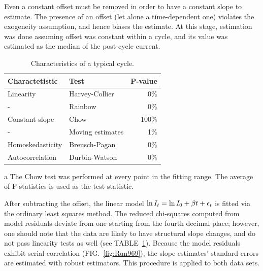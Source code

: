 \documentclass[reprint, superscriptaddress]{revtex4-1}
\begin{document}
Even a constant offset must be removed in order to have a constant slope to estimate. The presence of an offset (let alone a time-dependent one) violates the exogeneity assumption, and hence biases the estimate. At this stage, estimation was done assuming offset was constant within a cycle, and its value was estimated as the median of the post-cycle current.

\begin{table}
\centering
\begin{threeparttable}
	\caption{Characteristics of a typical cycle.\label{tbl:CycleChars}}
	\begin{tabular}{llr}
	\hline\hline
	Charactetistic	& Test 					& P-value\\
	\hline
	Linearity 		& Harvey-Collier		& 0\% \\
	-				& Rainbow				& 0\% \\
	Constant slope	& Chow\tnote{a}		 	& 100\% \\
	-				& Moving estimates		& 1\% \\
	Homoskedasticity& Breusch-Pagan 		& 0\% \\
	Autocorrelation & Durbin-Watson			& 0\% \\
	\hline\hline
	\end{tabular}
	\begin{tablenotes}
		\item[a]{The Chow test was performed at every point in the fitting range. The average of F-statistics is used as the test statistic.}
	\end{tablenotes}
\end{threeparttable}
\end{table}

After subtracting the offset, the linear model $\ln I_t = \ln I_0 + \slp t +\epsilon_t$ is fitted via the ordinary least squares method. The reduced chi-squares computed from model residuals deviate from one starting from the fourth decimal place; however, one should note that the data are likely to have structural slope changes, and do not pass linearity tests as well (see TABLE~\ref{tbl:CycleChars}). Because the model residuals exhibit serial correlation (FIG.~\ref{fig:Run969}), the slope estimates' standard errors are estimated with robust estimators. This procedure is applied to both data sets.
\end{document}
